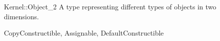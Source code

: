 \begin{ccRefConcept}{Kernel::Object_2}
A type representing different types of objects in two dimensions.

\ccRefines
CopyConstructible, Assignable, DefaultConstructible 

\ccSeeAlso
{} \\
\\
 \\
 \\

\end{ccRefConcept}
